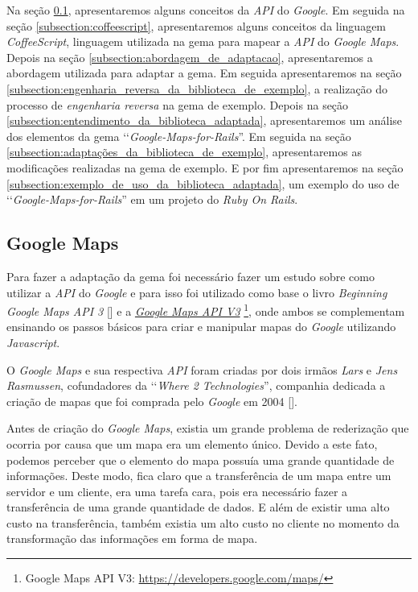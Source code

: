 Na seção \ref{subsection:google_maps}, apresentaremos alguns conceitos da \emph{API} do
\emph{Google}. Em seguida na seção \ref{subsection:coffeescript}, apresentaremos alguns conceitos da linguagem
\emph{CoffeeScript}, linguagem utilizada na gema para mapear a \emph{API} do \emph{Google Maps}. Depois na
seção \ref{subsection:abordagem_de_adaptacao}, apresentaremos a abordagem utilizada para adaptar a gema. Em
seguida apresentaremos na seção \ref{subsection:engenharia_reversa_da_biblioteca_de_exemplo}, a realização
do processo de \emph{engenharia reversa} na gema de exemplo. Depois na seção
\ref{subsection:entendimento_da_biblioteca_adaptada}, apresentaremos um análise dos elementos da gema
‘‘\emph{Google-Maps-for-Rails}''. Em seguida na seção \ref{subsection:adaptações_da_biblioteca_de_exemplo},
apresentaremos as modificações realizadas na gema de exemplo. E por fim apresentaremos na seção
\ref{subsection:exemplo_de_uso_da_biblioteca_adaptada}, um exemplo do uso de ‘‘\emph{Google-Maps-for-Rails}''
em um projeto do \emph{Ruby On Rails}.


\subsection{Google Maps}
\label{subsection:google_maps}


Para fazer a adaptação da gema foi necessário fazer um estudo sobre como utilizar a \emph{API} do
\emph{Google} e para isso foi utilizado como base o livro \emph{Beginning Google Maps API 3}
[] e a
\emph{\href{https://developers.google.com/maps/}{Google Maps API V3}}
\footnote{Google Maps API V3: \url{https://developers.google.com/maps/}}, onde ambos se complementam
ensinando os passos básicos para criar e manipular mapas do \emph{Google} utilizando \emph{Javascript}.

O \emph{Google Maps} e sua respectiva \emph{API} foram criadas por dois irmãos \emph{Lars} e
\emph{Jens Rasmussen}, cofundadores da ‘‘\emph{Where 2 Technologies}'', companhia dedicada a criação de mapas
que foi comprada pelo \emph{Google} em 2004 [].

Antes de criação do \emph{Google Maps}, existia um grande problema de rederização que ocorria por causa
que um mapa era um elemento único. Devido a este fato, podemos perceber que o elemento do mapa
possuía uma grande quantidade de informações. Deste modo, fica claro que a transferência de um mapa entre
um servidor e um cliente, era uma tarefa cara, pois era necessário fazer a transferência de uma grande
quantidade de dados. E além de existir uma alto custo na transferência, também existia um alto custo no
cliente no momento da transformação das informações em forma de mapa.

